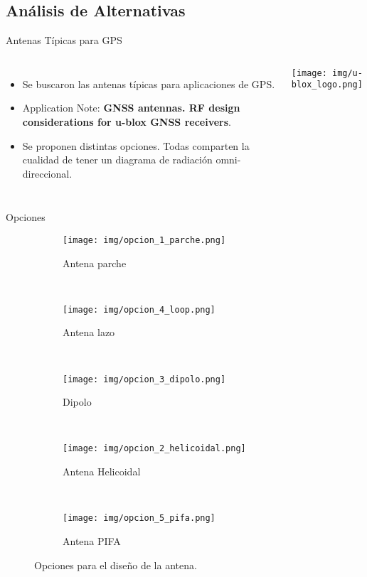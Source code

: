\subsection{Análisis de Alternativas}
\begin{frame}{Antenas Típicas para GPS}
\begin{columns}
        \begin{itemize}
            \item<1-> Se buscaron las antenas típicas para aplicaciones de GPS.
            \item<2-> Application Note: \textbf{GNSS antennas. RF design considerations for u-blox GNSS receivers}.
            \item<3-> Se proponen distintas opciones. Todas comparten la cualidad de tener un diagrama de radiación omni-direccional.
        \end{itemize}
            \texttt{[image: img/u-blox\_logo.png]}
\end{columns}
\end{frame}

\begin{frame}{Opciones}

\begin{figure}
    \centering
    \begin{subfigure}[b]{0.3\textwidth}
        \texttt{[image: img/opcion\_1\_parche.png]}
        \caption{Antena parche}
        \label{fig:opcion_1_parche}
    \end{subfigure}
    ~ 
    \begin{subfigure}[b]{0.3\textwidth}
        \texttt{[image: img/opcion\_4\_loop.png]}
        \caption{Antena lazo}
        \label{fig:opcion_4_loop}
    \end{subfigure}
    ~
    \begin{subfigure}[b]{0.3\textwidth}
        \texttt{[image: img/opcion\_3\_dipolo.png]}
        \caption{Dipolo}
        \label{fig:opcion_3_dipolo}
    \end{subfigure}
    ~
    \begin{subfigure}[b]{0.49\textwidth}
        \texttt{[image: img/opcion\_2\_helicoidal.png]}
        \caption{Antena Helicoidal}
        \label{fig:opcion_2_helicoidal}
    \end{subfigure}
    ~
    \begin{subfigure}[b]{0.49\textwidth}
        \texttt{[image: img/opcion\_5\_pifa.png]}
        \caption{Antena PIFA}
        \label{fig:opcion_5_pifa}
    \end{subfigure}
    \caption{Opciones para el diseño de la antena.}
    \label{fig:opciones_antenas}
\end{figure}

\end{frame}

